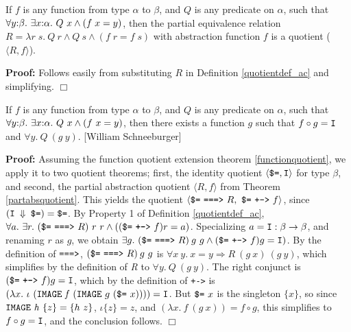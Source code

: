 \documentclass[envcountsame,runningheads]{llncs}
\newcommand{\repofabs}{\Downarrow}
\begin{document}
\begin{theorem}
\label{partabsquotient}
If $f$ is any function from type $\alpha$ to $\beta$,
and
$Q$ is any predicate on $\alpha$,
such that $\forall y{\tt :}\beta.\ \exists x{\tt :}\alpha.\ Q\ x \wedge (f\;x = y)$,
then the partial equivalence relation $R = \lambda r\;s.\ Q\ r \wedge Q\ s \wedge (f\;r = f\;s)$
with abstraction function $f$ is a quotient ($\langle R,f \rangle$).
\end{theorem}
{\bf Proof:}
Follows easily from substituting $R$
in Definition \ref{quotientdef_ac}
and simplifying.
$\Box$

\begin{theorem}
\label{partinverses}
If $f$ is any function from type $\alpha$ to $\beta$, and $Q$ is any
predicate on $\alpha$,
such that $\forall y{\tt :}\beta.\ \exists x{\tt :}\alpha.\ Q\ x \wedge (f\ x = y)$,
then there exists a function $g$ such that
$f \circ g = {\tt I}$
and
$\forall y.\ Q\ (g\ y)$.
{\rm
[William Schneeburger]}
\end{theorem}
{\bf Proof:}
Assuming the function quotient extension theorem
\ref{functionquotient},
we apply it to two quotient theorems;
first, the identity quotient
$\langle \mbox{\tt \$=}, \mbox{\tt I} \rangle$
for type $\beta$, and second,
the partial abstraction quotient $\langle R,f \rangle$
from Theorem \ref{partabsquotient}.
This yields the quotient
$\langle \mbox{\tt \$=}\ \mbox{\tt ===>}\ R,\
 \mbox{\tt \$=}\ \mbox{\tt +->}\ f \rangle$,
since $(\mbox{\tt I $\repofabs$ \$=}) = \mbox{\tt \$=}$.
By Property 1 of Definition \ref{quotientdef_ac},
$\forall a.\ \exists r.\ (\mbox{\tt \$=}\ \mbox{\tt ===>}\ R)\ r\ r \wedge
((
\mbox{\tt \$=}
\ \mbox{\tt +->}\ f) r = a)$.
Specializing $a = {\tt I}:\beta \rightarrow \beta$,
and renaming $r$ as $g$, we obtain
$\exists g.\ (\mbox{\tt \$=}\ \mbox{\tt ===>}\ R)\:g\ g \wedge
(\mbox{\tt \$=}\ \mbox{\tt +->}\ f) g = {\tt I})$.
By the definition of $\mbox{\tt ===>}$,
$(\mbox{\tt \$=}\ \mbox{\tt ===>}\ R)\:g\ g$ is
$\forall x\ y.\ x = y \Rightarrow R\ (g\ x)\ (g\ y)$,
which simplifies by the definition of {\it R\/} to $\forall y.\ Q\ (g\ y)$.
The right conjunct is
$
(\mbox{\tt \$=}\ \mbox{\tt +->}\ f) g = {\tt I}$,
which by the definition of {\tt +->} is
$
(\lambda x.\
\iota \ ({\tt IMAGE}\ {\it f}\ ({\tt IMAGE}\ g\ (\mbox{\tt \$=}\ x))))
 = {\tt I}$.
But $\mbox{\tt \$=}\ x$ is the singleton $\{x\}$,
so since ${\tt IMAGE}\ {\it h}\ \{z\} = \{h\ z\}$,
$\iota \{z\} = z$,
and $(\lambda x.\ f\ (g\ x)) = f \circ g$,
this
simplifies
to $
f \circ g = {\tt I}$,
and
the conclusion follows.
$\Box$
\end{document}
